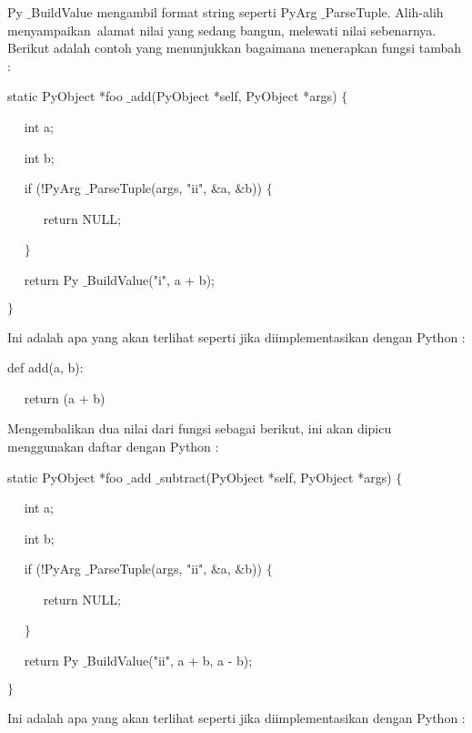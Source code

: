 \documentclass{wileySix}
\begin{document}
\begin{myEnumerate}
\begin{myEnumerate}
{\begin{myEnumerate}
\vspace{12pt}
\vspace{14pt}
Py $  \_  $BuildValue mengambil format string seperti PyArg $  \_  $ParseTuple. Alih-alih menyampaikan~alamat nilai yang sedang  bangun, melewati nilai sebenarnya. Berikut adalah contoh yang menunjukkan bagaimana menerapkan fungsi tambah : \par
\noindent 
static PyObject *foo $  \_  $add(PyObject *self, PyObject *args)  $  \{  $ \par
\noindent 
~~ int a; \par
\noindent 
~~ int b; \par
\vspace{12pt}
\noindent 
~~ if (!PyArg $  \_  $ParseTuple(args, "ii",  $  \&  $a,  $  \&  $b))  $  \{  $ \par
\noindent 
~~~~~ return NULL; \par
\noindent 
~~  $  \}  $ \par
\noindent 
~~ return Py $  \_  $BuildValue("i", a + b); \par
\noindent 
$  \}  $ \par
\vspace{14pt}
Ini adalah apa yang akan terlihat seperti jika diimplementasikan dengan Python : \par
\noindent 
def add(a, b): \par
\noindent 
~~ return (a + b) \par
\vspace{16pt}
Mengembalikan dua nilai dari fungsi sebagai berikut, ini akan dipicu menggunakan daftar dengan Python : \par
\noindent 
static PyObject *foo $  \_  $add $  \_  $subtract(PyObject *self, PyObject *args)  $  \{  $ \par
\noindent 
~~ int a; \par
\noindent 
~~ int b; \par
\vspace{12pt}
\noindent 
~~ if (!PyArg $  \_  $ParseTuple(args, "ii",  $  \&  $a,  $  \&  $b))  $  \{  $ \par
\noindent 
~~~~~ return NULL; \par
\noindent 
~~  $  \}  $ \par
\noindent 
~~ return Py $  \_  $BuildValue("ii", a + b, a - b); \par
\noindent 
$  \}  $ \par
\vspace{16pt}
Ini adalah apa yang akan terlihat seperti jika diimplementasikan dengan Python : \par

\end{myEnumerate}}
\end{myEnumerate}
\end{myEnumerate}
\end{document}
